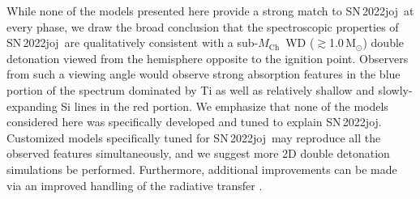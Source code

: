 \documentclass[twocolumn]{aastex631}
\newcommand{\sn}{SN\,2022joj}
\newcommand{\Mch}{$M_\mathrm{Ch}$}
\begin{document}
\begin{CJK*}{UTF8}{gbsn}
While none of the models presented here provide a strong match to \sn\ at every phase, we draw the broad conclusion that the spectroscopic properties of \sn\ are qualitatively consistent with a sub-\Mch\ WD ($\gtrsim$1.0\,$\mathrm{M_\odot}$) double detonation viewed from the hemisphere opposite to the ignition point. Observers from such a viewing angle would observe strong absorption features in the blue portion of the spectrum dominated by Ti as well as relatively shallow and slowly-expanding Si lines in the red portion. We emphasize that none of the models considered here was specifically developed and tuned to explain \sn. Customized models specifically tuned for \sn\ may reproduce all the observed features simultaneously, and we suggest more 2D double detonation simulations be performed. Furthermore, additional improvements can be made via an improved handling of the radiative transfer \citep[e.g., non-LTE effects; see][]{Shen_NLTE_2021}.


\end{CJK*}
\end{document}
